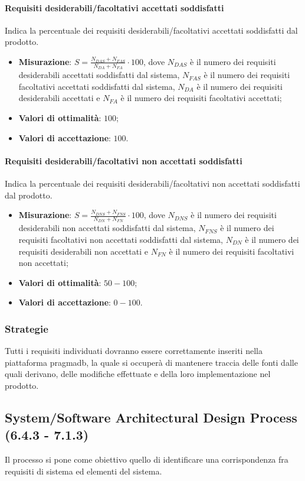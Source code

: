 \paragraph{Requisiti desiderabili/facoltativi accettati soddisfatti}
\label{reqAccSodd}
Indica la percentuale dei requisiti desiderabili/facoltativi accettati soddisfatti dal prodotto.
\begin{itemize}
\item \textbf{Misurazione}: $S=\frac{N_{DAS}+N_{FAS}}{N_{DA}+N_{FA}} \cdot 100$, dove $N_{DAS}$ è il numero dei requisiti desiderabili accettati soddisfatti dal sistema, $N_{FAS}$ è il numero dei requisiti facoltativi accettati soddisfatti dal sistema, $N_{DA}$ è il numero dei requisiti desiderabili accettati e $N_{FA}$ è il numero dei requisiti facoltativi accettati;
\item \textbf{Valori di ottimalità}: $100$;
\item \textbf{Valori di accettazione}: $100$.
\end{itemize}
\paragraph{Requisiti desiderabili/facoltativi non accettati soddisfatti}
\label{reqNonAccSodd}
Indica la percentuale dei requisiti desiderabili/facoltativi non accettati soddisfatti dal prodotto.
\begin{itemize}
\item \textbf{Misurazione}: $S=\frac{N_{DNS}+N_{FNS}}{N_{DN}+N_{FN}} \cdot 100$, dove $N_{DNS}$ è il numero dei requisiti desiderabili non accettati soddisfatti dal sistema, $N_{FNS}$ è il numero dei requisiti facoltativi non accettati soddisfatti dal sistema, $N_{DN}$ è il numero dei requisiti desiderabili non accettati e $N_{FN}$ è il numero dei requisiti facoltativi non accettati;
\item \textbf{Valori di ottimalità}: $50 - 100$;
\item \textbf{Valori di accettazione}: $0 - 100$.
\end{itemize}
\subsubsection{Strategie}
Tutti i requisiti individuati dovranno essere correttamente inseriti nella piattaforma pragmadb, la quale si occuperà di mantenere traccia delle fonti dalle quali derivano, delle modifiche effettuate e della loro implementazione nel prodotto.
\subsection{System/Software Architectural Design Process (6.4.3 - 7.1.3)}
\label{sySoArchiDesign}
Il processo si pone come obiettivo quello di identificare una corrispondenza fra requisiti di sistema ed elementi del sistema.
